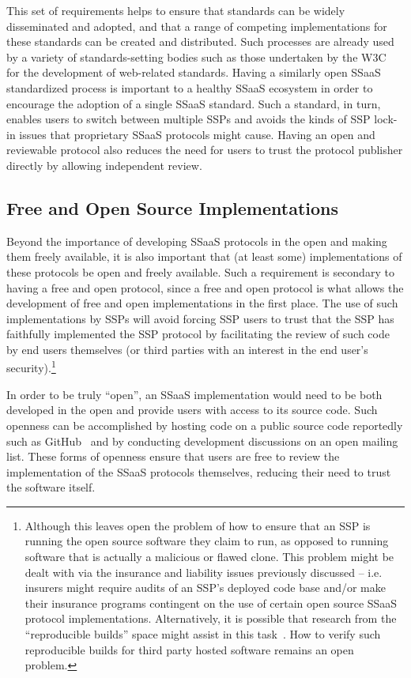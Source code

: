 This set of requirements helps to ensure that standards can be widely
disseminated and adopted, and that a range of competing
implementations for these standards can be created and
distributed. Such processes are already used by a variety of
standards-setting bodies such as those undertaken by the
W3C~\cite{w3c} for the development of web-related standards. Having a
similarly open SSaaS standardized process is important to a healthy
SSaaS ecosystem in order to encourage the adoption of a single SSaaS
standard. Such a standard, in turn, enables users to switch between
multiple SSPs and avoids the kinds of SSP lock-in issues that
proprietary SSaaS protocols might cause. Having an open and reviewable
protocol also reduces the need for users to trust the protocol
publisher directly by allowing independent review.

\subsection{Free and Open Source Implementations}

Beyond the importance of developing SSaaS protocols in the open and
making them freely available, it is also important that (at least
some) implementations of these protocols be open and freely
available. Such a requirement is secondary to having a free and open
protocol, since a free and open protocol is what allows the
development of free and open implementations in the first place. The
use of such implementations by SSPs will avoid forcing SSP users to
trust that the SSP has faithfully implemented the SSP protocol by
facilitating the review of such code by end users themselves (or third
parties with an interest in the end user's
security).\footnote{Although this leaves open the problem of how to
  ensure that an SSP is running the open source software they claim to
  run, as opposed to running software that is actually a malicious or
  flawed clone. This problem might be dealt with via the insurance and
  liability issues previously discussed -- i.e. insurers might require
  audits of an SSP's deployed code base and/or make their insurance
  programs contingent on the use of certain open source SSaaS protocol
  implementations. Alternatively, it is possible that research from
  the ``reproducible builds'' space might assist in this
  task~\cite{DeCarnedeCarnavalet2014}. How to verify such reproducible
  builds for third party hosted software remains an open problem.}

In order to be truly ``open'', an SSaaS implementation would need to
be both developed in the open and provide users with access to its
source code. Such openness can be accomplished by hosting code on a
public source code reportedly such as GitHub~\cite{github} and by
conducting development discussions on an open mailing list. These
forms of openness ensure that users are free to review the
implementation of the SSaaS protocols themselves, reducing their need
to trust the software itself.

